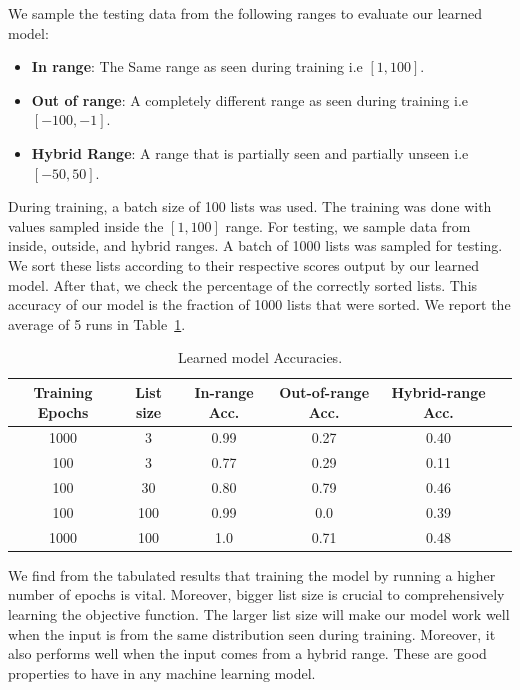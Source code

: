 \documentclass[12pt, twoside, ngerman]{report}
\begin{document}
We sample the testing data from the following ranges to evaluate our learned model:
\begin{itemize}
\item \textbf{In range}: The Same range as seen during training i.e $[1, 100]$.
\item \textbf{Out of range}: A completely different range as seen during training i.e $[-100, -1]$.
\item \textbf{Hybrid Range}: A range that is partially seen and partially unseen i.e $[-50, 50]$.
\end{itemize} 
 
During training, a batch size of 100 lists was used. The training was done with values sampled inside the $[1, 100]$ range.
For testing, we sample data from inside, outside, and hybrid ranges.
A batch of 1000 lists was sampled for testing.
We sort these lists according to their respective scores output by our learned model.
After that, we check the percentage of the correctly sorted lists.
This accuracy of our model is the fraction of 1000 lists that were sorted.
We report the average of 5 runs in Table~\ref{table:caseStudyResults}.

\begin{table} [h!]
\centering
\resizebox{\linewidth}{!} {
\begin{tabular}{ | c | c | c | c | c | c | }
\hline
\textbf{Training Epochs} & \textbf{List size} & \textbf{In-range Acc.} & \textbf{Out-of-range Acc.} & \textbf{Hybrid-range Acc.} \\ [0.5 ex]
\hline \hline
1000 & 3 & 0.99 & 0.27 & 0.40\\
100 & 3  & 0.77 & 0.29 & 0.11\\
100 & 30  & 0.80 & 0.79 & 0.46\\
100 & 100  & 0.99 & 0.0 & 0.39\\
1000 & 100  & 1.0 & 0.71 & 0.48\\
\hline
\end{tabular}
}
\caption{Learned model Accuracies.}
\label {table:caseStudyResults}
\end{table}

We find from the tabulated results that training the model by running a higher number of epochs is vital.
Moreover, bigger list size is crucial to comprehensively learning the objective function.
The larger list size will make our model work well when the input is from the same distribution seen during training.
Moreover,  it also performs well when the input comes from a hybrid range.
These are good properties to have in any machine learning model.
\end{document}
